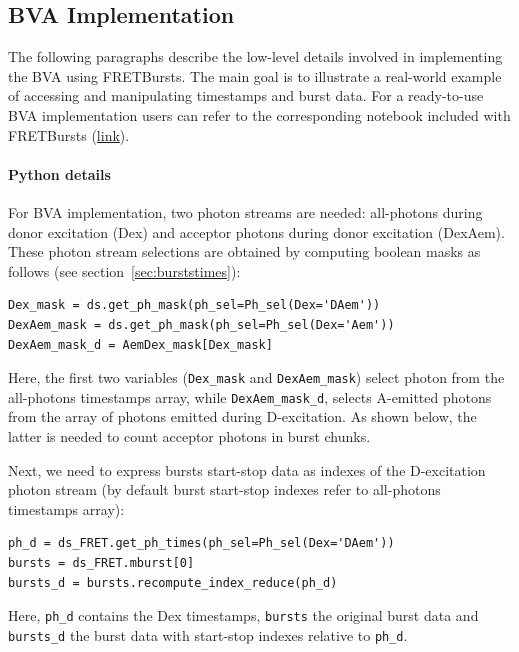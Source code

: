 \documentclass[10pt,letterpaper]{article}
\begin{document}
\subsection{BVA Implementation}

The following paragraphs describe the low-level details involved in implementing the BVA using FRETBursts.
The main goal is to illustrate a real-world example of accessing and manipulating timestamps and burst data.
For a ready-to-use BVA implementation users can refer to the corresponding notebook included with FRETBursts
(\href{http://nbviewer.jupyter.org/github/tritemio/FRETBursts_notebooks/blob/master/notebooks/Example%20-%20Burst%20Variance%20Analysis.ipynb}{link}).

\paragraph{Python details}
For BVA implementation, two photon streams are needed: all-photons during donor excitation (Dex) 
and acceptor photons during donor excitation (DexAem). 
These photon stream selections are obtained by computing boolean masks as follows 
(see section~\ref{sec:burststimes}):

\begin{lstlisting}
Dex_mask = ds.get_ph_mask(ph_sel=Ph_sel(Dex='DAem'))   
DexAem_mask = ds.get_ph_mask(ph_sel=Ph_sel(Dex='Aem'))
DexAem_mask_d = AemDex_mask[Dex_mask]
\end{lstlisting}

Here, the first two variables (\verb|Dex_mask| and \verb|DexAem_mask|)
select photon from the all-photons timestamps array,
while \verb|DexAem_mask_d|, selects A-emitted photons from the
array of photons emitted during D-excitation. As shown below, 
the latter is needed to count acceptor photons in burst chunks.

Next, we need to express bursts start-stop data as indexes of the D-excitation photon stream 
(by default burst start-stop indexes refer to all-photons timestamps array):

\begin{lstlisting}
ph_d = ds_FRET.get_ph_times(ph_sel=Ph_sel(Dex='DAem'))
bursts = ds_FRET.mburst[0] 
bursts_d = bursts.recompute_index_reduce(ph_d)
\end{lstlisting}

Here, \verb|ph_d| contains the Dex timestamps, \verb|bursts| the original burst data and 
\verb|bursts_d| the burst data with start-stop indexes relative to \verb|ph_d|.
\end{document}
